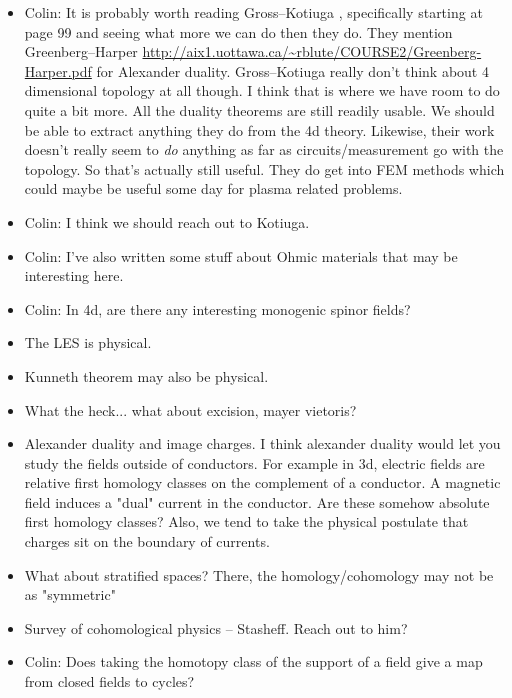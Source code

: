 \documentclass{article}
\begin{document}
\begin{itemize}
    \item Colin: It is probably worth reading Gross--Kotiuga \cite{gross_electromagnetic_2004}, specifically starting at page 99 and seeing what more we can do then they do. They mention Greenberg--Harper \url{http://aix1.uottawa.ca/~rblute/COURSE2/Greenberg-Harper.pdf} for Alexander duality. Gross--Kotiuga really don't think about 4 dimensional topology at all though. I think that is where we have room to do quite a bit more. All the duality theorems are still readily usable. We should be able to extract anything they do from the 4d theory. Likewise, their work doesn't really seem to \emph{do} anything as far as circuits/measurement go with the topology. So that's actually still useful. They do get into FEM methods which could maybe be useful some day for plasma related problems.
    \item Colin: I think we should reach out to Kotiuga.
    \item Colin: I've also written some stuff about Ohmic materials that may be interesting here.
    \item Colin: In 4d, are there any interesting monogenic spinor fields?
    \item The LES is physical.
    \item Kunneth theorem may also be physical.
    \item What the heck... what about excision, mayer vietoris? 
    \item Alexander duality and image charges. I think alexander duality would let you study the fields outside of conductors. For example in 3d, electric fields are relative first homology classes on the complement of a conductor. A magnetic field induces a "dual" current in the conductor. Are these somehow absolute first homology classes? Also, we tend to take the physical postulate that charges sit on the boundary of currents.
    \item What about stratified spaces? There, the homology/cohomology may not be as "symmetric"
    \item Survey of cohomological physics -- Stasheff. Reach out to him?
    \item Colin: Does taking the homotopy class of the support of a field give a map from closed fields to cycles?
\end{itemize}
\end{document}
